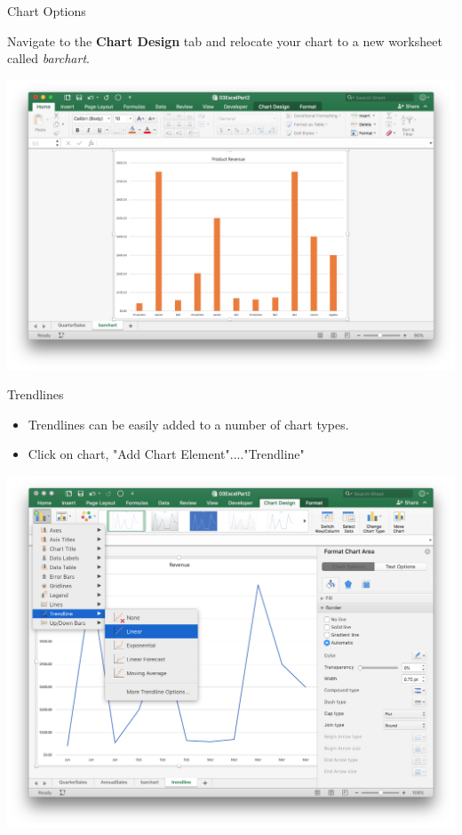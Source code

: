 \documentclass[xcolor=svgnames, handout]{beamer}
\begin{document}
\begin{frame}{Chart Options}
\begin{example}
Navigate to the {\bf Chart Design} tab and relocate your chart to a new worksheet called \textit{barchart}. 
\end{example}
 \begin{center}
  \includegraphics[width=.8\textwidth]{barcharttab}
 \end{center}
\end{frame}


\begin{frame}{Trendlines}
\begin{itemize}
\item Trendlines can be easily added to a number of  chart types.  
\item  Click on chart, "Add Chart Element"...."Trendline"
\end{itemize}
 \begin{center}
  \includegraphics[width=.8\textwidth]{trendline}
 \end{center}
\end{frame}
\end{document}
